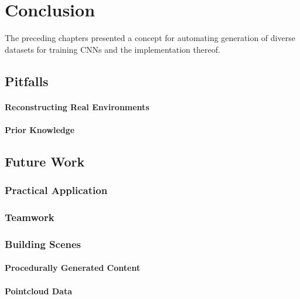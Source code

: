 \chapter{Conclusion}
The preceding chapters presented a concept for automating generation of diverse datasets for training \acp{CNN} and the implementation thereof.


\section{Pitfalls}
\subsubsection{Reconstructing Real Environments}
\subsubsection{Prior Knowledge}

\section{Future Work}
\subsection{Practical Application}

\subsection{Teamwork}

\subsection{Building Scenes}
\subsubsection{Procedurally Generated Content}

\subsubsection{Pointcloud Data}